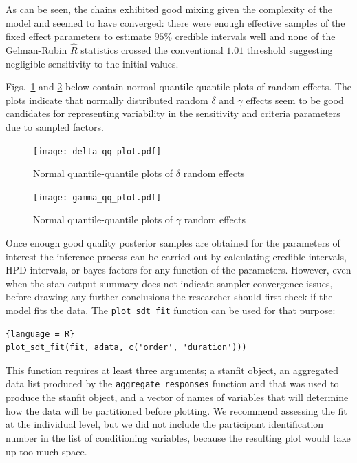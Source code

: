 \documentclass[oneside,a4paper]{article}
\begin{document}
As can be seen, the chains exhibited good mixing given the complexity
of the model and seemed to have converged: there were enough effective
samples of the fixed effect parameters to estimate $95\%$ credible
intervals well and none of the Gelman-Rubin $\hat{R}$ statistics
crossed the conventional $1.01$ threshold suggesting negligible
sensitivity to the initial values.

Figs.~\ref{fig:6} and \ref{fig:7} below contain normal
quantile-quantile plots of random effects. The plots indicate that
normally distributed random $\delta$ and $\gamma$ effects seem to be
good candidates for representing variability in the sensitivity and
criteria parameters due to sampled factors.

\begin{figure}[H]
  \centering
  \texttt{[image: delta\_qq\_plot.pdf]}
  \caption{Normal quantile-quantile plots of $\delta$ random effects}
  \label{fig:6}
\end{figure}

\begin{figure}[H]
  \centering
  \texttt{[image: gamma\_qq\_plot.pdf]}
  \caption{Normal quantile-quantile plots of $\gamma$ random effects}
  \label{fig:7}
\end{figure}

Once enough good quality posterior samples are obtained for the
parameters of interest the inference process can be carried out by
calculating credible intervals, HPD intervals, or bayes factors for
any function of the parameters. However, even when the stan output
summary does not indicate sampler convergence issues, before drawing
any further conclusions the researcher should first check if the model
fits the data. The \texttt{plot\_sdt\_fit} function can be used for
that purpose:

\begin{lstlisting}{language = R}
plot_sdt_fit(fit, adata, c('order', 'duration')))
\end{lstlisting}

This function requires at least three arguments; a stanfit object, an
aggregated data list produced by the \texttt{aggregate\_responses}
function and that was used to produce the stanfit object, and a vector
of names of variables that will determine how the data will be
partitioned before plotting. We recommend assessing the fit at the
individual level, but we did not include the participant
identification number in the list of conditioning variables, because
the resulting plot would take up too much space.
\end{document}
